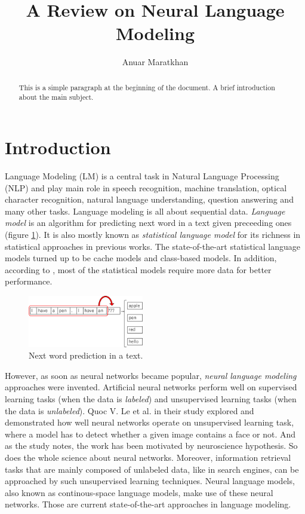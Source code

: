 \documentclass{IEEEtran}
\title{A Review on Neural Language Modeling}
\author{Anuar Maratkhan}
\affil{School of Science and Technology\\Nazarbayev University\\anuar.maratkhan@nu.edu.kz}
\begin{document}
\maketitle

\begin{abstract}
This is a simple paragraph at the beginning of the document. A brief introduction about the main subject.
\end{abstract}

\section{Introduction}

Language Modeling (LM) is a central task in Natural Language Processing (NLP) and play main role in speech recognition, machine translation, optical character recognition, natural language understanding, question answering and many other tasks. Language modeling is all about sequential data. \textit{Language model} is an algorithm for predicting next word in a text given preceeding ones (figure \ref{fig:sequence}). It is also mostly known as \textit{statistical language model} for its richness in statistical approaches in previous works. The state-of-the-art statistical language models turned up to be cache models and class-based models. In addition, according to \cite{Mikolov2010NeuralLM}, most of the statistical models require more data for better performance. 

\begin{figure}[h]
	\centering
	\includegraphics[width=0.45\textwidth]{sequence}
	\caption{Next word prediction in a text.}
	\label{fig:sequence}
\end{figure}

However, as soon as neural networks became popular, \textit{neural language modeling} approaches were invented. Artificial neural networks perform well on supervised learning tasks (when the data is \textit{labeled}) and unsupervised learning tasks (when the data is \textit{unlabeled}). Quoc V. Le et al. in their study \cite{unsupervised} explored and demonstrated how well neural networks operate on unsupervised learning task, where a model has to detect whether a given image contains a face or not. And as the study \cite{unsupervised} notes, the work has been motivated by neuroscience hypothesis. So does the whole science about neural networks. Moreover, information retrieval tasks that are mainly composed of unlabeled data, like in search engines, can be approached by such unsupervised learning techniques. Neural language models, also known as continous-space language models, make use of these neural networks. Those are current state-of-the-art approaches in language modeling.
\end{document}
